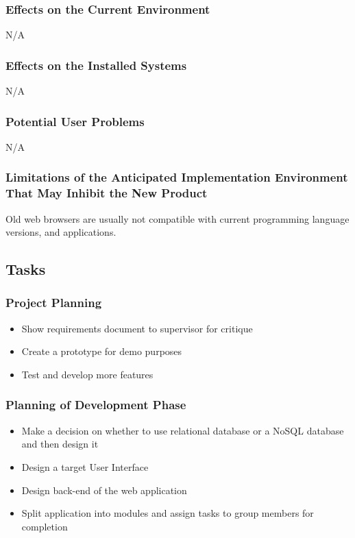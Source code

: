 \documentclass[12pt]{article}
\begin{document}
\subsubsection{Effects on the Current Environment}
N/A


\subsubsection{Effects on the Installed Systems}
N/A


\subsubsection{Potential User Problems}
N/A

\subsubsection{Limitations of the Anticipated Implementation Environment That May Inhibit the New Product}
Old web browsers are usually not compatible with current programming language versions, and applications.

\subsection{Tasks}
\subsubsection{Project Planning}
\begin{itemize}
\item Show requirements document to supervisor for critique
\item Create a prototype for demo purposes
\item Test and develop more features
\end{itemize}
\subsubsection{Planning of Development Phase}
\begin{itemize}
\item Make a decision on whether to use relational database or a NoSQL database and then design it
\item Design a target User Interface
\item Design back-end of the web application
\item Split application into modules and assign tasks to group members for completion
\end{itemize}
\end{document}
